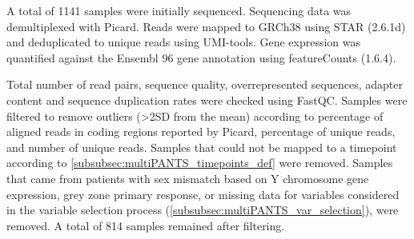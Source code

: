 \begin{outline}
A total of 1141 samples were initially sequenced.
Sequencing data was demultiplexed with Picard.
%
Reads were mapped to GRCh38 using STAR (2.6.1d) and deduplicated to unique reads using UMI-tools.
Gene expression was quantified against the Ensembl 96 gene annotation using featureCounts (1.6.4).

Total number of read pairs, sequence quality, overrepresented sequences, adapter content and sequence duplication rates were checked using FastQC.
Samples were filtered to remove outliers (>2SD from the mean) according to percentage of aligned reads in coding regions reported by Picard, percentage of unique reads, and number of unique reads.
Samples that could not be mapped to a timepoint according to \autoref{subsubsec:multiPANTS_timepoints_def} were removed.
Samples that came from patients with 
sex mismatch based on Y chromosome gene expression,
grey zone primary response, 
or missing data for variables considered in the variable selection process (\autoref{subsubsec:multiPANTS_var_selection}),
were removed.
A total of 814 samples remained after filtering.


\end{outline}
